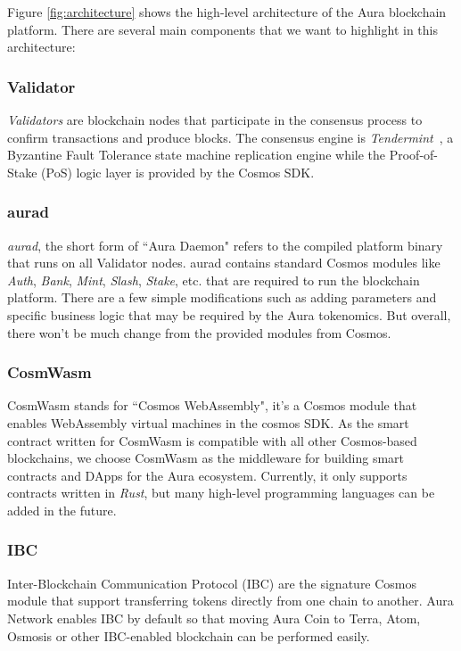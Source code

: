 \documentclass[11pt, titlepage]{article}
\begin{document}
Figure \ref{fig:architecture} shows the high-level architecture of the Aura blockchain platform. There are several main components that we want to highlight in this architecture:

\subsubsection*{Validator}
\emph{Validators} are blockchain nodes that participate in the consensus process to confirm transactions and produce blocks.
The consensus engine is \emph{Tendermint}~\cite{buchman2016tendermint}, a Byzantine Fault Tolerance state machine replication engine while the Proof-of-Stake (PoS) logic layer is provided by the Cosmos SDK. 

\subsubsection*{aurad}
\emph{aurad}, the short form of ``Aura Daemon" refers to the compiled platform binary that runs on all Validator nodes. aurad contains standard Cosmos modules like \emph{Auth}, \emph{Bank}, \emph{Mint}, \emph{Slash}, \emph{Stake}, etc. that are required to run the blockchain platform. There are a few simple modifications such as adding parameters and specific business logic that may be required by the Aura tokenomics. But overall, there won't be much change from the provided modules from Cosmos.

\subsubsection*{CosmWasm}
CosmWasm stands for ``Cosmos WebAssembly", it's a Cosmos module that enables WebAssembly virtual machines in the cosmos SDK. As the smart contract written for CosmWasm is compatible with all other Cosmos-based blockchains, we choose CosmWasm as the middleware for building smart contracts and DApps for the Aura ecosystem. Currently, it only supports contracts written in \emph{Rust}, but many high-level programming languages can be added in the future.

\subsubsection*{IBC}
Inter-Blockchain Communication Protocol (IBC) are the signature Cosmos module that support transferring tokens directly from one chain to another. Aura Network enables IBC by default so that moving Aura Coin to Terra, Atom, Osmosis or other IBC-enabled blockchain can be performed easily.
\end{document}
